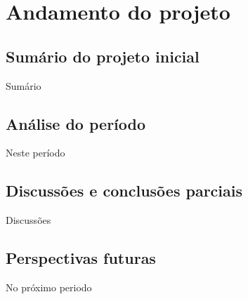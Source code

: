 \chapter{Andamento do projeto}\label{ch:introducao}
\section{Sumário do projeto inicial}
Sumário
\section{Análise do período}
Neste período
\section{Discussões e conclusões parciais}
Discussões 
\section{Perspectivas futuras}
No próximo periodo
